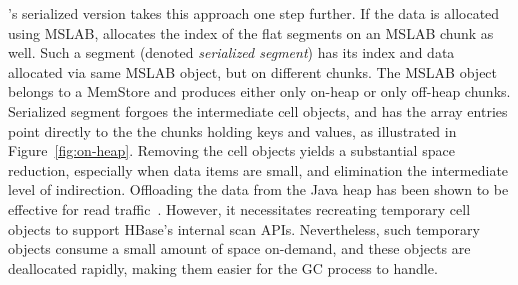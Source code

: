\sys's serialized version takes this approach one step further. If the data is allocated using MSLAB, \sys\/ allocates the index of the flat segments on an MSLAB chunk as well. Such a segment (denoted \emph{serialized segment}) has its index and data allocated via same MSLAB object, but on different chunks. The MSLAB object belongs to a MemStore and produces either only on-heap or only off-heap chunks. Serialized segment forgoes the intermediate cell
objects, and has the array entries point directly to the the chunks holding keys and values, as illustrated in Figure~\ref{fig:on-heap}.  
Removing the cell objects yields
a substantial space reduction, especially when data items are small, and elimination the intermediate level of indirection. Offloading the data from the Java heap
has been shown to be effective for read traffic~\cite{alibabahbase}. However, it necessitates recreating temporary
cell objects to support HBase's internal scan APIs. Nevertheless, such temporary objects consume  a small amount of space on-demand, 
and these objects are  deallocated rapidly, making them easier for the GC process to handle.



